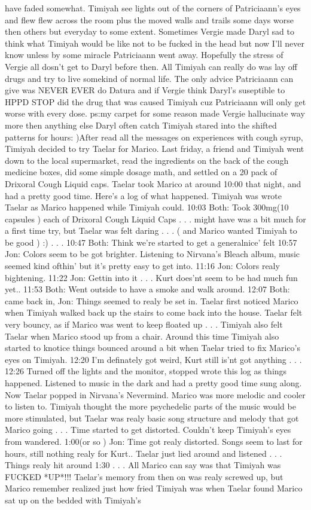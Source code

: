 \documentclass[12pt]{book}
\begin{document}
have faded somewhat. Timiyah see lights out of the corners of Patriciaann's eyes and flew flew across the room plus the moved walls and trails some days worse then others but everyday to some extent. Sometimes Vergie made Daryl sad to think what Timiyah would be like not to be fucked in the head but now I'll never know unless by some miracle Patriciaann went away. Hopefully the stress of Vergie all dosn't get to Daryl before then. All Timiyah can really do was lay off drugs and try to live somekind of normal life. The only advice Patriciaann can give was NEVER EVER do Datura and if Vergie think Daryl's suseptible to HPPD STOP did the drug that was caused Timiyah cuz Patriciaann will only get worse with every dose. ps:my carpet for some reason made Vergie hallucinate way more then anything else Daryl often catch Timiyah stared into the shifted patterns for hours: )After read all the messages on experiences with cough syrup, Timiyah decided to try Taelar for Marico. Last friday, a friend and Timiyah went down to the local supermarket, read the ingredients on the back of the cough medicine boxes, did some simple dosage math, and settled on a 20 pack of Drixoral Cough Liquid caps. Taelar took Marico at around 10:00 that night, and had a pretty good time. Here's a log of what happened. Timiyah was wrote Taelar as Marico happened while Timiyah could. 10:03 Both: Took 300mg(10 capsules ) each of Drixoral Cough Liquid Caps . . .  might have was a bit much for a first time try, but Taelar was felt daring . . .  ( and Marico wanted Timiyah to be good ) :) . . .  10:47 Both: Think we're started to get a generalnice' felt 10:57 Jon: Colors seem to be got brighter. Listening to Nirvana's Bleach album, music seemed kind ofthin' but it's pretty easy to get into. 11:16 Jon: Colors realy bightening. 11:22 Jon: Gettin into it . . .  Kurt does'nt seem to be had much fun yet.. 11:53 Both: Went outside to have a smoke and walk around. 12:07 Both: came back in, Jon: Things seemed to realy be set in. Taelar first noticed Marico when Timiyah walked back up the stairs to come back into the house. Taelar felt very bouncy, as if Marico was went to keep floated up . . .  Timiyah also felt Taelar when Marico stood up from a chair. Around this time Timiyah also started to knotice things bounced around a bit when Taelar tried to fix Marico's eyes on Timiyah. 12:20 I'm definately got weird, Kurt still is'nt got anything . . .  12:26 Turned off the lights and the monitor, stopped wrote this log as things happened. Listened to music in the dark and had a pretty good time sung along. Now Taelar popped in Nirvana's Nevermind. Marico was more melodic and cooler to listen to. Timiyah thought the more psychedelic parts of the music would be more stimulated, but Taelar was realy basic song structure and melody that got Marico going . . .  Time started to get distorted. Couldn't keep Timiyah's eyes from wandered. 1:00(or so ) Jon: Time got realy distorted. Songs seem to last for hours, still nothing realy for Kurt.. Taelar just lied around and listened . . .  Things realy hit around 1:30 . . .  All Marico can say was that Timiyah was FUCKED *UP*!!! Taelar's memory from then on was realy screwed up, but Marico remember realized just how fried Timiyah was when Taelar found Marico sat up on the bedded with Timiyah's 
\end{document}
